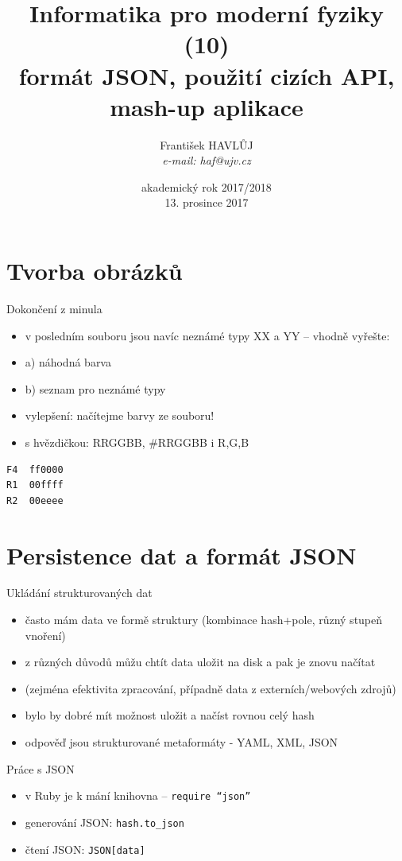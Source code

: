 \documentclass{beamer}
\title[IMF (10)]{Informatika pro moderní fyziky (10)\\ formát JSON, použití cizích API, mash-up aplikace}
\author[Franti\v{s}ek HAVL\r{U}J, ORF ÚJV Řež]{Franti\v{s}ek HAVL\r{U}J\\{\scriptsize \emph{e-mail: haf@ujv.cz}}}
\date{akademický rok 2017/2018\\13. prosince 2017}
\institute[ORF ÚJV Řež]
{ÚJV Řež\\oddělení Reaktorové fyziky a podpory palivového cyklu}
\begin{document}
\begin{frame}
  \titlepage
\end{frame}

\begin{frame}
  \tableofcontents
\end{frame}

\section{Tvorba obrázků}

\begin{frame}[fragile]{Dokončení z minula}
  \begin{itemize}
    \item v posledním souboru jsou navíc neznámé typy XX a YY -- vhodně vyřešte:
    \item a) náhodná barva
    \item b) seznam pro neznámé typy
    \item vylepšení: načítejme barvy ze souboru!
    \item s hvězdičkou: RRGGBB, \#RRGGBB i R,G,B
  \end{itemize}
\begin{verbatim}
F4  ff0000
R1  00ffff
R2  00eeee
\end{verbatim}
\end{frame}

\section{Persistence dat a formát JSON}

\begin{frame}{Ukládání strukturovaných dat}
  \begin{itemize}
    \item často mám data ve formě struktury (kombinace hash+pole, různý stupeň vnoření)
    \item z různých důvodů můžu chtít data uložit na disk a pak je znovu načítat
    \item (zejména efektivita zpracování, případně data z externích/webových zdrojů)
    \item bylo by dobré mít možnost uložit a načíst rovnou celý hash
    \item odpověď jsou strukturované metaformáty - YAML, XML, JSON
  \end{itemize}
\end{frame}

\begin{frame}{Práce s JSON}
  \begin{itemize}
    \item v Ruby je k mání knihovna -- \texttt{require ``json''}
    \item generování JSON: \texttt{hash.to\_json}
    \item čtení JSON: \texttt{JSON[data]}
  \end{itemize}
\end{frame}
\end{document}
